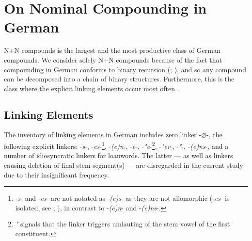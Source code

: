 \documentclass[10pt, a4paper]{article}
\newcommand{\zeroLinker}{\ensuremath{\boldsymbol{\varnothing}}}
\begin{document}

\section{On Nominal Compounding in German}
\label{sec:comps}

N+N compounds is the largest and the most productive class of German compounds. We consider solely N+N compounds because of the fact that compounding in German conforms to binary recursion (\citealp[219]{eisenberg_2013}; \citealp[226-227]{schaefer_2018}), and so any compound can be decomposed into a chain of binary structures. Furthermore, this is the class where the explicit linking elements occur most often \citep{schluecker_2023}.


\subsection{Linking Elements}
\label{sec:linkers}

The inventory of linking elements in German includes zero linker -{\zeroLinker}-, the following explicit linkers: -\textit{s}-, -\textit{es}-\footnote{-\textit{s}- and -\textit{es}- are not notated as -\textit{(e)s}- as they are not allomorphic (-\textit{es}- is isolated, see \citealp[229]{eisenberg_2013}; \citealp{kuerschner_2010}), in contrast to -\textit{(e)n}- and -\textit{(e)ns}-.}, -\textit{(e)n}-, -\textit{e}-, -\textit{"e}-\footnote{\textit{"} signals that the linker triggers umlauting of the stem vowel of the first constituent.}, -\textit{"er}-, -\textit{"}-, -\textit{(e)ns}-, and a number of idiosyncratic linkers for loanwords. The latter --- as well as linkers causing deletion of final stem segment(s) --- are disregarded in the current study due to their insignificant frequency.

\end{document}
